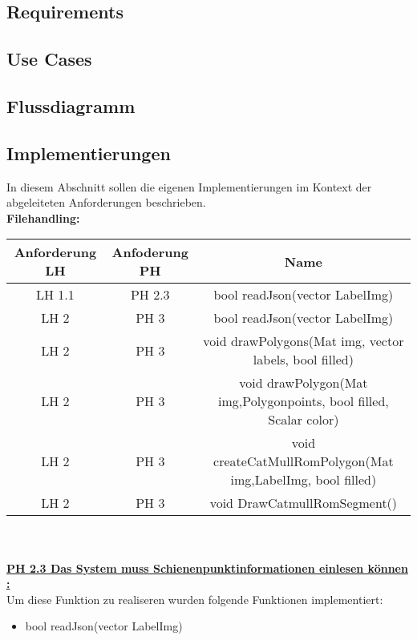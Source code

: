 \documentclass[11pt]{scrartcl}
\begin{document}
\subsection{Requirements}
\label{sec:Requirements}
\subsection{Use Cases}
\label{sec:Use Cases}
\subsection{Flussdiagramm}
\label{sec:Flussdiagramm}
\subsection{Implementierungen}
\label{sec:Implementierungen}

In diesem Abschnitt sollen die eigenen Implementierungen im Kontext der abgeleiteten Anforderungen beschrieben.
\\

\noindent
\textbf{Filehandling:}
\\

\noindent
\begin{tabular}[h]{c|c|c}
Anforderung LH & Anfoderung PH & Name \\
\hline
 LH 1.1 & PH 2.3 & bool  readJson(vector LabelImg)\\
LH 2 & PH 3 & bool readJson(vector LabelImg)\\
LH 2 & PH 3 &void drawPolygons(Mat img, vector labels, bool filled)\\
LH 2 & PH 3 & void drawPolygon(Mat img,Polygonpoints, bool filled, Scalar color)\\
LH 2 & PH 3 &void createCatMullRomPolygon(Mat img,LabelImg, bool filled)\\
LH 2 & PH 3 &void DrawCatmullRomSegment()\\

\end{tabular}
\\
\\

\noindent
\underline{\textbf{PH 2.3 Das System muss Schienenpunktinformationen einlesen können :}}
\\

\noindent
Um diese Funktion zu realiseren wurden folgende Funktionen implementiert:
\begin{itemize}
	\item bool readJson(vector LabelImg)
\end{itemize}
\end{document}
